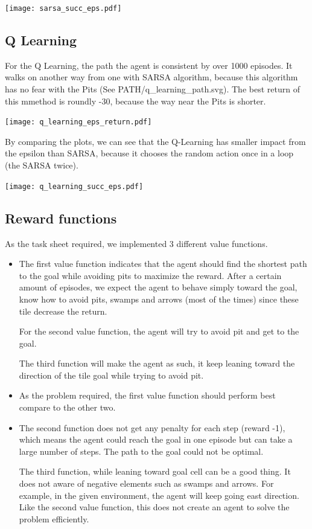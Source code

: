 \documentclass[11pt]{article}
\begin{document}
\texttt{[image: sarsa\_succ\_eps.pdf]}

\subsection{Q Learning}

For the Q Learning, the path the agent is consistent by over 1000 episodes. It walks on another way from one with SARSA algorithm, because this algorithm has no fear with the Pits (See PATH/q\_learning\_path.svg). The best return of this mmethod is roundly -30, because the way near the Pits is shorter.

\texttt{[image: q\_learning\_eps\_return.pdf]}

By comparing the plots, we can see that the Q-Learning has smaller impact from the epsilon than SARSA, because it chooses the random action once in a loop (the SARSA twice).

\texttt{[image: q\_learning\_succ\_eps.pdf]}

\subsection{Reward functions}

As the task sheet required, we implemented 3 different value functions. 
\begin{itemize}
  \item The first value function indicates that the agent should find the shortest path to the goal while avoiding pits to maximize the reward. After a certain amount of episodes, we expect the agent to behave simply toward the goal, know how to avoid pits, swamps and arrows (most of the times) since these tile decrease the return.

  For the second value function, the agent will try to avoid pit and get to the goal. 

  The third function will make the agent as such, it keep leaning toward the direction of the tile goal while trying to avoid pit.

  \item As the problem required, the first value function should perform best compare to the other two.

  \item The second function does not get any penalty for each step (reward -1), which means the agent could reach the goal in one episode but can take a large number of steps. The path to the goal could not be optimal.

  The third function, while leaning toward goal cell can be a good thing. It does not aware of negative elements such as swamps and arrows. For example, in the given environment, the agent will keep going east direction. Like the second value function, this does not create an agent to solve the problem efficiently.
\end{itemize}
\end{document}
